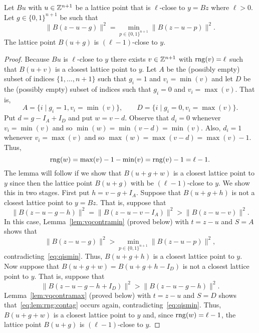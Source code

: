 \documentclass[final,leqno]{siamltex}
\begin{document}
\begin{lemma}\label{lem:rngdecreases}
Let $Bu$ with $u \in {\mathbb Z}^{n+1}$ be a lattice point that is $\ell$-close to $y = Bz$ where $\ell > 0$.  Let $g \in \{0,1\}^{n+1}$ be such that
\begin{equation}\label{eq:qismin}
\|B(z - u - g)\|^2 = \min_{p \in \{0,1\}^{n+1}}\|B(z - u - p)\|^2.
\end{equation}
The lattice point $B(u+g)$ is $(\ell-1)$-close to $y$.
\end{lemma}
\begin{proof}
Because $Bu$ is $\ell$-close to $y$ there exists $v \in {\mathbb Z}^{n+1}$ with $\operatorname{rng}(v) = \ell$ such that $B(u+v)$ is a closest lattice point to $y$.  Let $A$ be the (possibly empty) subset of indices $\{1,\dots,n+1\}$ such that $g_i = 1$ and $v_i = \min(v)$ and let $D$ be the (possibly empty) subset of indices such that $g_i = 0$ and $v_i = \max(v)$. That is,
\[
A = \{i \mid g_i = 1, v_i = \min(v) \}, \qquad D = \{i \mid g_i = 0, v_i = \max(v) \}.
\]
Put $d = g - I_A + I_D$ and put $w = v - d$.  Observe that $d_i = 0$ whenever $v_i = \min(v)$ and so $\min(w) = \min(v-d) = \min(v)$.  Also, $d_i = 1$ whenever $v_i = \max(v)$ and so $\max(w) = \max(v-d) = \max(v) - 1$.  Thus,
\[
\operatorname{rng}(w) = \max(v) - 1 - \min(v) = \operatorname{rng}(v) - 1 = \ell - 1.
\]
The lemma will follow if we show that $B(u+g+w)$ is a closest lattice point to $y$ since then the lattice point $B(u+g)$ with be $(\ell-1)$-close to $y$.  We show this in two stages.  First put $h = v - g + I_A$.  Suppose that $B(u+g+h)$ is not a closest lattice point to $y = Bz$.  That is, suppose that 
\[
\|B(z-u-g-h)\|^2 = \|B(z-u-v-I_A)\|^2 > \|B(z-u-v)\|^2.
\]
In this case, Lemma~\ref{lem:vqcontramin} (proved below) with $t = z-u$ and $S = A$ shows that 
\begin{equation}\label{eq:lem:rng:contag}
\|B(z-u - g)\|^2 > \min_{p \in \{0,1\}^{n+1}}\|B(z- u - p)\|^2,
\end{equation}
contradicting~\eqref{eq:qismin}.  Thus, $B(u+g+h)$ is a closest lattice point to $y$.  Now suppose that $B(u+g+w) = B(u+g+h-I_D)$ is not a closest lattice point to $y$.  That is, suppose that
\[
\|B(z-u-g-h+I_D)\|^2 > \|B(z-u-g-h)\|^2.
\]
Lemma~\ref{lem:vqcontramax} (proved below) with $t = z-u$ and $S = D$ shows that~\eqref{eq:lem:rng:contag} occurs again, contradicting~\eqref{eq:qismin}.  Thus, $B(u+g+w)$ is a closest lattice point to $y$ and, since $\operatorname{rng}(w) = \ell-1$, the lattice point $B(u+g)$ is $(\ell-1)$-close to $y$.
 \end{proof}
\end{document}
